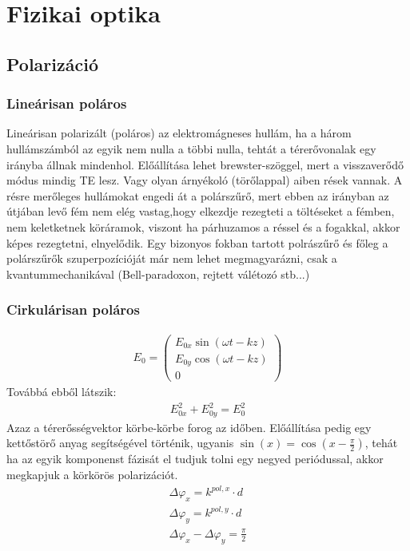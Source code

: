 \documentclass{article}
\begin{document}
\section{Fizikai optika}
\subsection{Polarizáció}
\subsubsection{Lineárisan poláros}
Lineárisan polarizált (poláros) az elektromágneses hullám, ha a három hullámszámból az egyik nem nulla a többi nulla, tehtát a térerővonalak egy irányba állnak mindenhol. Előállítása lehet brewster-szöggel, mert a visszaverődő módus mindig TE lesz. Vagy olyan árnyékoló (törőlappal) aiben rések vannak. A résre merőleges hullámokat engedi át a polárszűrő, mert ebben az irányban az útjában levő fém nem elég vastag,hogy elkezdje rezegteti a töltéseket a fémben, nem keletketnek köráramok, viszont ha párhuzamos a réssel és a fogakkal, akkor képes rezegtetni, elnyelődik. Egy bizonyos fokban tartott polrászűrő és főleg a polárszűrők szuperpozícióját már nem lehet megmagyarázni, csak a kvantummechanikával (Bell-paradoxon, rejtett válétozó stb...)
\subsubsection{Cirkulárisan poláros}
\begin{gather*}
E_0 = \begin{pmatrix}
E_{0x} \sin(\omega t -kz) \\
E_{0y} \cos(\omega t - kz) \\
0
\end{pmatrix}
\end{gather*}
Továbbá ebből látszik:
\begin{gather*}
E_{0x}^2 + E_{0y}^2 = E_0^2
\end{gather*}
Azaz a térerősségvektor körbe-körbe forog az időben. Előállítása pedig egy kettőstörő anyag segítségével történik, ugyanis $\sin(x) = \cos(x-\frac{\pi}{2})$, tehát ha az egyik komponenst fázisát el tudjuk tolni egy negyed periódussal, akkor megkapjuk a körkörös polarizációt. 
\begin{gather*}
\Delta \varphi_x = k^{pol,x} \cdot d\\
\Delta \varphi_y = k^{pol,y} \cdot d \\
\Delta \varphi_x- \Delta \varphi_y = \frac{\pi}{2}
\end{gather*}
\end{document}

